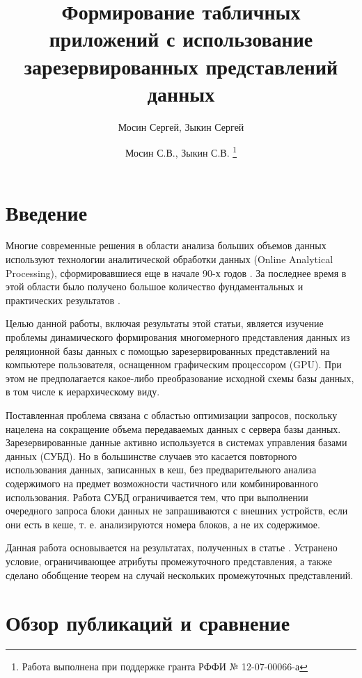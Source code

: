 \documentclass[10pt,a4paper]{article}
\author{Мосин Сергей, Зыкин Сергей}
\title{Формирование табличных приложений с использование зарезервированных
представлений данных}
\author{
Мосин С.В., Зыкин С.В. \footnote{Работа выполнена при поддержке гранта РФФИ №
12-07-00066-а}
}
\date{}
\begin{document}
\maketitle

\section{Введение}

Многие современные решения в области анализа больших объемов данных
используют технологии аналитической обработки данных (Online Analytical
Processing), сформировавшиеся еще в начале 90-х годов \cite{codd}. За последнее
время в этой области было получено большое количество фундаментальных
\cite{lecht,lehner,mazon} и практических результатов \cite{vassi, peder,
progressive, giorg}.

Целью данной работы, включая результаты этой статьи, является изучение
проблемы динамического формирования
многомерного представления данных из реляционной базы данных с
помощью зарезервированных представлений на компьютере пользователя, оснащенном
графическим процессором (GPU). При этом не предполагается какое-либо
преобразование исходной схемы базы данных, в том числе к иерархическому виду.

Поставленная проблема связана с областью оптимизации
запросов, поскольку нацелена на сокращение объема передаваемых данных с сервера
базы данных. Зарезервированные данные активно используется в системах управления
базами данных (СУБД). Но в большинстве случаев это касается повторного
использования данных, записанных в кеш, без предварительного анализа
содержимого на предмет возможности частичного или комбинированного
использования. Работа СУБД ограничивается тем, что при выполнении очередного
запроса блоки данных не запрашиваются с внешних устройств, если они есть в
кеше, т. е. анализируются номера блоков, а не их содержимое.

Данная работа основывается на результатах, полученных в
статье \cite{zyk_pol}. Устранено условие, ограничивающее атрибуты промежуточного
представления, а также сделано обобщение теорем на случай нескольких
промежуточных представлений.

\section{Обзор публикаций и сравнение}
\end{document}
